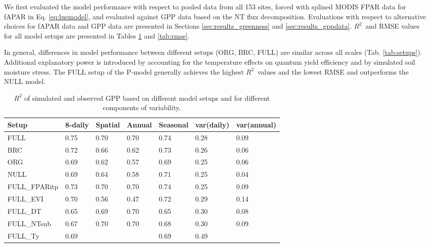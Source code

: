 \documentclass{myreport}
\newcommand{\rsq}{$R^2$}
\begin{document}
We first evaluated the model performance with respect to pooled data from all 153 sites, forced with splined MODIS FPAR data for fAPAR in Eq. \ref{eq:luemodel}, and evaluated against GPP data based on the NT flux decomposition. Evaluations with respect to alternative choices for fAPAR data and GPP data are presented in Sections \ref{sec:results_greenness} and \ref{sec:results_gppdata}. \rsq\ and RMSE values for all model setups are presented in Tables \ref{tab:rsq} and \ref{tab:rmse}.

In general, differences in model performance between different setups  (ORG, BRC, FULL) are similar across all scales (Tab. \ref{tab:setups}). Additional explanatory power is introduced by accounting for the temperature effects on quantum yield efficiency and by simulated soil moisture stress. The FULL setup of the P-model generally achieves the highest \rsq\ values and the lowest RMSE and outperforms the NULL model.


\begin{table}
\centering
\begin{tabular}{lllllll}
  \toprule
  Setup & 8-daily & Spatial & Annual & Seasonal & var(daily) & var(annual) \\ 
  \midrule
  FULL & 0.75 & 0.70 & 0.70 & 0.74 & 0.28 & 0.09 \\ 
  BRC & 0.72 & 0.66 & 0.62 & 0.73 & 0.26 & 0.06 \\ 
  ORG & 0.69 & 0.62 & 0.57 & 0.69 & 0.25 & 0.06 \\ 
  NULL & 0.69 & 0.64 & 0.58 & 0.71 & 0.25 & 0.04 \\ 
  \midrule
  FULL\_FPARitp & 0.73 & 0.70 & 0.70 & 0.74 & 0.25 & 0.09 \\ 
  FULL\_EVI & 0.70 & 0.56 & 0.47 & 0.72 & 0.29 & 0.14 \\ 
  \midrule
  FULL\_DT & 0.65 & 0.69 & 0.70 & 0.65 & 0.30 & 0.08 \\ 
  FULL\_NTsub & 0.67 & 0.70 & 0.70 & 0.68 & 0.30 & 0.09 \\ 
  FULL\_Ty & 0.69 &  &  & 0.69 & 0.49 & \\ 
  \bottomrule
  \end{tabular}
\caption{$R^2$ of simulated and observed GPP based on different model setups and for different components of variability.} 
\label{tab:rsq}
\end{table}
\end{document}
